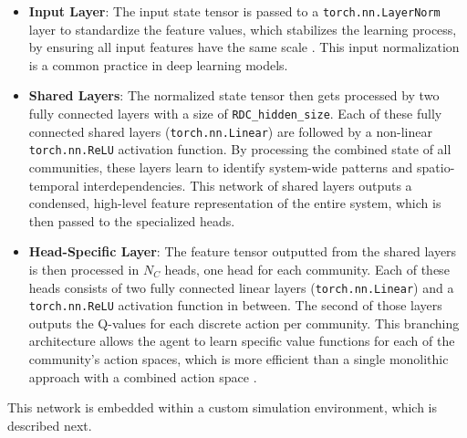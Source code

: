 \begin{itemize}
    \item \textbf{Input Layer}:
        The input state tensor is passed to a \texttt{torch.nn.LayerNorm} layer to standardize the feature values, which stabilizes the learning process, by ensuring all input features have the same scale \cite{ba_layer_2016}.
        This input normalization is a common practice in deep learning models.
    \item \textbf{Shared Layers}:
        The normalized state tensor then gets processed by two fully connected layers with a size of \texttt{RDC\_hidden\_size}.
        Each of these fully connected shared layers (\texttt{torch.nn.Linear}) are followed by a non-linear \texttt{torch.nn.ReLU} activation function.
        By processing the combined state of all communities, these layers learn to identify system-wide patterns and spatio-temporal interdependencies.
        This network of shared layers outputs a condensed, high-level feature representation of the entire system, which is then passed to the specialized heads.
    \item \textbf{Head-Specific Layer}:
        The feature tensor outputted from the shared layers is then processed in $N_C$ heads, one head for each community.
        Each of these heads consists of two fully connected linear layers (\texttt{torch.nn.Linear}) and a \texttt{torch.nn.ReLU} activation function in between.
        The second of those layers outputs the Q-values for each discrete action per community.
        This branching architecture allows the agent to learn specific value functions for each of the community's action spaces, which is more efficient than a single monolithic approach with a combined action space \cite{li_personalized_2024}.
\end{itemize}

This network is embedded within a custom simulation environment, which is described next.

